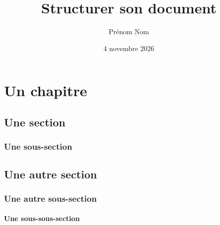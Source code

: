 \documentclass[]{book}
\title{Structurer son document}
\author{Prénom Nom}
\date{4 novembre 2026}
\begin{document}

\maketitle%

\chapter{Un chapitre}%

\section{Une section}

\lipsum[1-2]
\subsection{Une sous-section}

\lipsum[3-4]
\section{Une autre section}

\subsection{Une autre sous-section}

\subsubsection{Une sous-sous-section}%

\lipsum[5-6]

\tableofcontents
\end{document}

